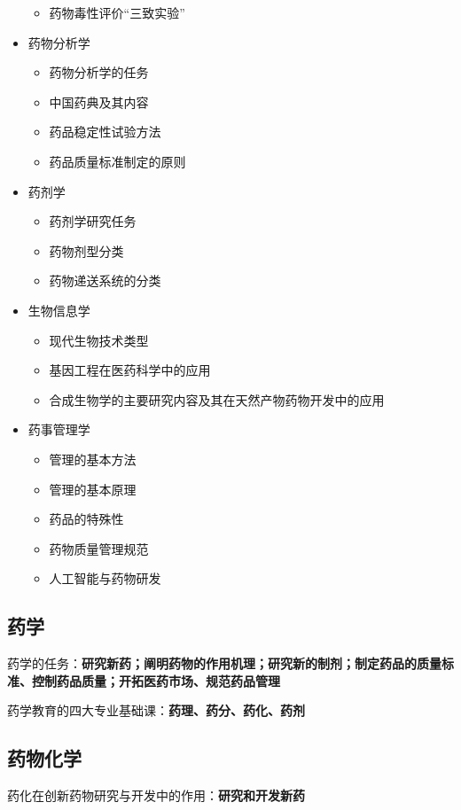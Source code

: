 \begin{itemize}
\begin{itemize}
        \item 药物毒性评价“三致实验”
    \end{itemize}
    \item 药物分析学
    \begin{itemize}
        \item 药物分析学的任务
        \item 中国药典及其内容
        \item 药品稳定性试验方法
        \item 药品质量标准制定的原则
    \end{itemize}
    \item 药剂学
    \begin{itemize}
        \item 药剂学研究任务
        \item 药物剂型分类
        \item 药物递送系统的分类
    \end{itemize}
    \item 生物信息学
    \begin{itemize}
        \item 现代生物技术类型
        \item 基因工程在医药科学中的应用
        \item 合成生物学的主要研究内容及其在天然产物药物开发中的应用
    \end{itemize}
    \item 药事管理学
    \begin{itemize}
        \item 管理的基本方法
        \item 管理的基本原理
        \item 药品的特殊性
        \item 药物质量管理规范
        \item 人工智能与药物研发
    \end{itemize}
\end{itemize}
\subsection{药学}%
\label{sub:复习：药学}
\begin{notation}
    药学的任务：\textbf{研究新药；阐明药物的作用机理；研究新的制剂；制定药品的质量标准、控制药品质量；开拓医药市场、规范药品管理}
\end{notation}
\begin{notation}
    药学教育的四大专业基础课：\textbf{药理、药分、药化、药剂}
\end{notation}
\subsection{药物化学}%
\label{sub:复习：药物化学}
\begin{notation}
    药化在创新药物研究与开发中的作用：\textbf{研究和开发新药}
\end{notation}
